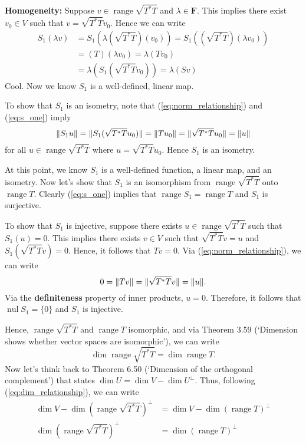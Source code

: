 \documentclass{article}
\begin{document}
\textbf{Homogeneity:} Suppose $v\in\operatorname{range}\sqrt{T^*T}$ and $\lambda\in\mathbf{F}$. This implies there exist $v_0\in V$ such that $v=\sqrt{T^*T}v_0$. Hence we can write
\begin{align*}
    S_1(\lambda v)&=S_1(\lambda (\sqrt{T^*T})(v_0))=S_1((\sqrt{T^*T})(\lambda v_0))\\
    &=(T)(\lambda v_0)=\lambda(Tv_0)\\
    &=\lambda(S_1(\sqrt{T^*T}v_0))=\lambda(Sv)
\end{align*}
Cool. Now we know $S_1$ is a well-defined, linear map.

To show that $S_1$ is an isometry, note that (\ref{eq:norm_relationship}) and (\ref{eq:s_one}) imply
\begin{equation}\label{eq:norm_relation_s_one}
\lVert S_1 u\rVert=\lVert S_1(\sqrt{T^*T}u_0)\rVert=\lVert Tu_0\rVert=\lVert\sqrt{T^*T}u_0\rVert=\lVert u\rVert
\end{equation}
for all $u\in\operatorname{range}\sqrt{T^*T}$ where $u=\sqrt{T^*T}u_0$. Hence $S_1$ is an isometry.

At this point, we know $S_1$ is a well-defined function, a linear map, and an isometry. Now let's show that $S_1$ is an isomorphism from $\operatorname{range}\sqrt{T^*T}$ onto $\operatorname{range}T$. Clearly (\ref{eq:s_one}) implies that $\operatorname{range}S_1=\operatorname{range}T$ and $S_1$ is surjective. 

To show that $S_1$ is injective, suppose there exists $u\in \operatorname{range}\sqrt{T^*T}$ such that $S_1(u)=0$. This implies there exists $v\in V$ such that $\sqrt{T^*T}v=u$ and $S_1(\sqrt{T^*T}v)=0$. Hence, it follows that $Tv=0$. Via (\ref{eq:norm_relationship}), we can write
\[0=\lVert Tv\rVert=\lVert\sqrt{T^*T}v\rVert=\lVert u\rVert.\]
Via the \textbf{definiteness} property of inner products, $u=0$. Therefore, it follows that $\operatorname{nul}S_1=\{0\}$ and $S_1$ is injective.

Hence, $\operatorname{range}\sqrt{T^*T}$ and $\operatorname{range}T$ isomorphic, and via Theorem 3.59 (`Dimension shows whether vector spaces are isomorphic'), we can write
\begin{equation}\label{eq:dim_relationship}
    \operatorname{dim}\operatorname{range}\sqrt{T^*T}=\operatorname{dim}\operatorname{range}T.
\end{equation}
Now let's think back to Theorem 6.50 (`Dimension of the orthogonal complement') that states $\operatorname{dim}U=\operatorname{dim}V-\operatorname{dim}U^\bot$. Thus, following (\ref{eq:dim_relationship}), we can write
\begin{align*}
    \operatorname{dim}V-\operatorname{dim}(\operatorname{range}\sqrt{T^*T})^\bot&=\operatorname{dim}V-\operatorname{dim}(\operatorname{range}T)^\bot\\
    \operatorname{dim}(\operatorname{range}\sqrt{T^*T})^\bot&=\operatorname{dim}(\operatorname{range}T)^\bot
\end{align*}
\end{document}
